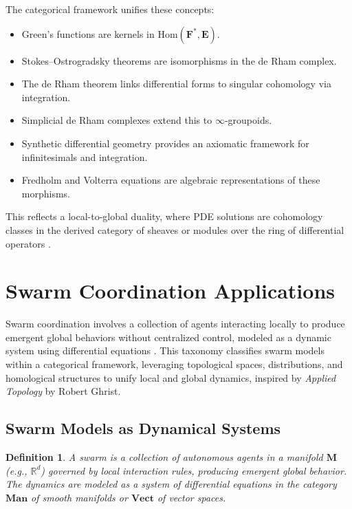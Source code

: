 \documentclass{article}
\theoremstyle{plain}
\newtheorem{definition}{Definition}[section]
\newcommand{\cat}[1]{\mathbf{#1}}
\newcommand{\Hom}{\mathrm{Hom}}
\begin{document}
The categorical framework unifies these concepts:
\begin{itemize}
    \item Green's functions are kernels in \(\Hom(\cat{F}^*, \cat{E})\).
    \item Stokes--Ostrogradsky theorems are isomorphisms in the de Rham complex.
    \item The de Rham theorem links differential forms to singular cohomology via integration.
    \item Simplicial de Rham complexes extend this to \(\infty\)-groupoids.
    \item Synthetic differential geometry provides an axiomatic framework for infinitesimals and integration.
    \item Fredholm and Volterra equations are algebraic representations of these morphisms.
\end{itemize}

This reflects a local-to-global duality, where PDE solutions are cohomology
classes in the derived category of sheaves or modules over the ring of differential
operators \cite{nLab_de_Rham_theorem, nLab_synthetic_diff_geom}.

\section{Swarm Coordination Applications}

Swarm coordination involves a collection of agents interacting locally to produce emergent global behaviors without centralized control, modeled as a dynamic system using differential equations \cite{nLab_dynamical_systems}. This taxonomy classifies swarm models within a categorical framework, leveraging topological spaces, distributions, and homological structures to unify local and global dynamics, inspired by \emph{Applied Topology} by Robert Ghrist.

\subsection{Swarm Models as Dynamical Systems}

\begin{definition}
A \emph{swarm} is a collection of autonomous agents in a manifold \(\cat{M}\) (e.g., \(\mathbb{R}^d\)) governed by local interaction rules, producing emergent global behavior. The dynamics are modeled as a system of differential equations in the category \(\cat{Man}\) of smooth manifolds or \(\cat{Vect}\) of vector spaces.
\end{definition}
\end{document}
